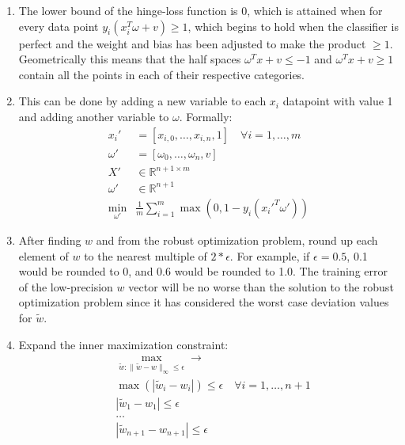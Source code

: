 \documentclass[11pt]{article}
\begin{document}
\begin{solution}
\begin{enumerate}
    \item The lower bound of the hinge-loss function is 0, which is attained when for every data point $y_i (x_i^T \omega + v) \geq 1$, which begins to hold when the classifier is perfect and the weight and bias has been adjusted to make the product $\geq 1$. Geometrically this means that the half spaces $\omega^T x + v \leq -1$ and $\omega^T x + v \geq 1$ contain all the points in each of their respective categories.

    \item This can be done by adding a new variable to each $x_i$ datapoint with value 1 and adding another variable to $\omega$. Formally:
    \begin{align*}
        x_i' &= [x_{i,0}, \dots, x_{i,n}, 1] \quad \forall i = 1, \dots, m \\
        \omega' &= [\omega_0, \dots, \omega_n, v] \\
        X' &\in \mathbb{R}^{n+1 \times m} \\
        \omega' &\in \mathbb{R}^{n+1} \\
        \min_{\omega'} &\frac{1}{m} \sum_{i=1}^m \max(0, 1 - y_i(x_i'^T \omega'))
    \end{align*}

    \item After finding $w$ and from the robust optimization problem, round up each element of $w$ to the nearest multiple of $2 * \epsilon$. For example, if $\epsilon = 0.5$, 0.1 would be rounded to 0, and 0.6 would be rounded to 1.0. The training error of the low-precision $w$ vector will be no worse than the solution to the robust optimization problem since it has considered the worst case deviation values for $\tilde{w}$.

    \item Expand the inner maximization constraint:
    \begin{align*}
        &\max_{\tilde{w} : \|\tilde{w} - w\|_{\infty} \leq \epsilon} \rightarrow \\
        &\max(|\tilde{w}_i - w_i|) \leq \epsilon \quad \forall i = 1, \dots, n+1 \\
        &|\tilde{w}_1 - w_1| \leq \epsilon \\
        &\dots \\
        &|\tilde{w}_{n+1} - w_{n+1}| \leq \epsilon
    \end{align*}


\end{enumerate}
\end{solution}
\end{document}
